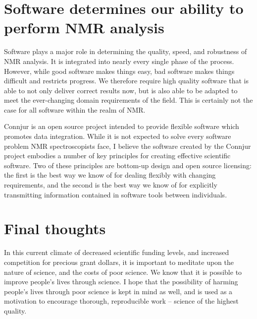\section{Software determines our ability to perform NMR analysis}
Software plays a major role in determining the quality, speed, and robustness
of NMR analysis.  It is integrated into nearly every single phase of the 
process.  However, while good software makes things easy, bad software makes
things difficult and restricts progress.  We therefore require high quality
software that is able to not only deliver correct results now, but is also able
to be adapted to meet the ever-changing domain requirements of the field.
This is certainly not the case for all software within the realm of NMR.

Connjur is an open source project intended to provide flexible software which
promotes data integration.  While it is not expected to solve every software
problem NMR spectroscopists face, I believe the software created by the Connjur
project embodies a number of key principles for creating effective scientific
software.  Two of these principles are bottom-up design and open source licensing:
the first is the best way we know of for dealing flexibly with changing
requirements, and the second is the best way we know of for explicitly 
transmitting information contained in software tools between individuals.


\section{Final thoughts}
In this current climate of decreased scientific funding levels, and increased
competition for precious grant dollars, it is important to meditate upon the
nature of science, and the costs of poor science.  We know that it is possible
to improve people's lives through science.  I hope that the possibility of 
harming people's lives through poor science is kept in mind as well, and is 
used as a motivation to encourage thorough, reproducible work -- science of
the highest quality.


